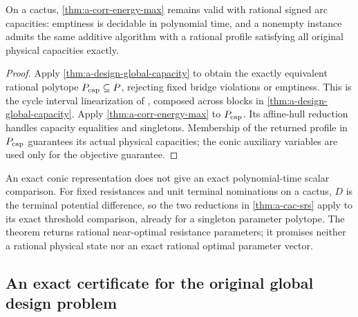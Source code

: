 \begin{corollary}
\label{cor:a-corr-energy-capacity}
On a cactus, \cref{thm:a-corr-energy-max} remains valid with rational
signed arc capacities: emptiness is decidable in polynomial time, and a
nonempty instance admits the same additive algorithm with a rational
profile satisfying all original physical capacities exactly.
\end{corollary}
\begin{proof}
Apply \cref{thm:a-design-global-capacity} to obtain the exactly equivalent
rational polytope $P_{\rm cap}\subseteq P$, rejecting fixed bridge
violations or emptiness. This is the cycle interval linearization of
\citet[Proposition 4.9, Lemma 4.10, Proposition 4.11]{amann2018-deciding-robust-feasibility-and-infeasibility},
composed across blocks in \cref{thm:a-design-global-capacity}. Apply
\cref{thm:a-corr-energy-max} to $P_{\rm cap}$. Its affine-hull reduction
handles capacity equalities and singletons. Membership of the returned
profile in $P_{\rm cap}$ guarantees its actual physical capacities;
the conic auxiliary variables are used only for the objective guarantee.
\end{proof}

An exact conic representation does not give an exact polynomial-time
scalar comparison. For fixed resistances and unit terminal nominations
on a cactus, $D$ is the terminal potential difference, so the two
reductions in \cref{thm:a-cac-srs} apply to its exact threshold
comparison, already for a singleton parameter polytope. The theorem
returns rational near-optimal resistance parameters; it promises neither
a rational physical state nor an exact rational optimal parameter vector.

\subsection{An exact certificate for the original global design problem}

